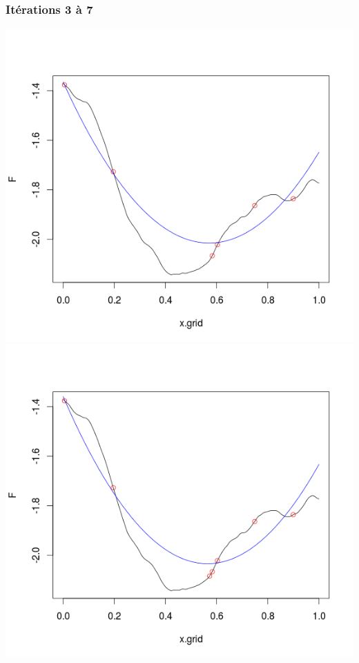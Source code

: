 \begin{frame}
\frametitle{Itérations 3 à 7}
\includegraphics[trim = 10mm 20mm 10mm 10mm, clip, width=.3\paperwidth]{fig/prs3.png}
\includegraphics[trim = 10mm 20mm 10mm 10mm, clip, width=.3\paperwidth]{fig/prs4.png}

\end{frame}

